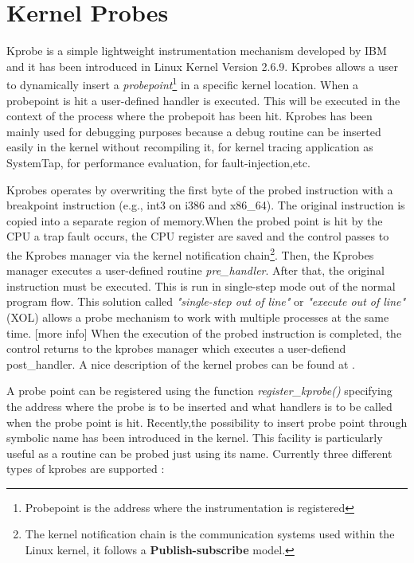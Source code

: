 \section{Kernel Probes}
\label{kernel_probes}
Kprobe \cite{Kprobes:2006} is a simple lightweight instrumentation mechanism developed by IBM and it has been introduced in Linux Kernel Version 2.6.9. Kprobes allows a user to dynamically insert a \textit{probepoint}\footnote{Probepoint is the address where the instrumentation is registered } in a specific kernel location. When a probepoint is hit a user-defined handler is executed. This will be executed in the context of the process where the probepoit has been hit. Kprobes has been mainly used for debugging purposes because a debug routine can be inserted easily in the kernel without recompiling it, for kernel tracing application as SystemTap\cite{SystemTap:Online}, for performance evaluation, for fault-injection,etc.  
\par
Kprobes operates by overwriting the first byte of the probed instruction with a breakpoint instruction (e.g., int3 on i386 and x86\_64). The original instruction is copied into a separate region of memory.When the probed point is hit by the CPU a trap fault occurs, the CPU register are saved and the control passes to the Kprobes manager via the kernel notification chain\footnote{The kernel notification chain is the communication systems used within the Linux kernel, it follows a \textbf{Publish-subscribe} model.}.
Then, the Kprobes manager executes a user-defined routine \textit{pre\_handler}. After that, the original instruction must be executed. This is run in single-step mode out of the normal program flow. This solution called \textit{"single-step out of line"} or  \textit{"execute out of line"} (XOL) allows a probe mechanism to work with multiple processes at the same time. [more info] 
When the execution of the probed instruction is completed, the control returns to the kprobes manager which executes  a user-defiend post\_handler. A nice description of the kernel probes can be found at \cite{Sudhanshu:2006:Online}.  
\par
A probe point can be registered using the function \textit{register\_kprobe()} specifying the address where the probe is to be inserted and what  handlers is to be called when the probe point is hit. Recently,the possibility to insert probe point through symbolic name has been introduced in the kernel. This facility is particularly useful as a routine can be probed just using its name.
Currently three different types of kprobes are supported : 

